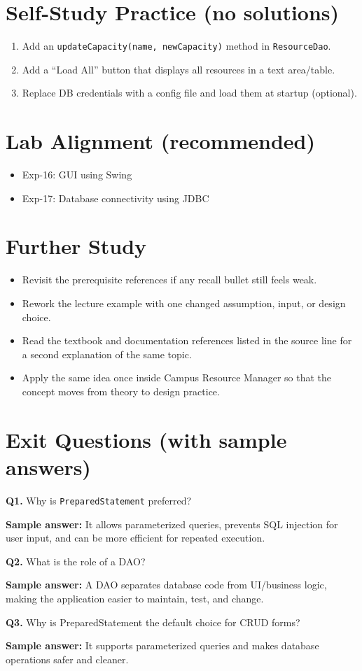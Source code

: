 \documentclass[11pt]{article}
\begin{document}
\section{Self-Study Practice (no solutions)}
\begin{enumerate}
  \item Add an \texttt{updateCapacity(name, newCapacity)} method in \texttt{ResourceDao}.
  \item Add a ``Load All'' button that displays all resources in a text area/table.
  \item Replace DB credentials with a config file and load them at startup (optional).
\end{enumerate}

\section{Lab Alignment (recommended)}
\begin{itemize}
  \item Exp-16: GUI using Swing
  \item Exp-17: Database connectivity using JDBC
\end{itemize}

\section{Further Study}
\begin{itemize}
  \item Revisit the prerequisite references if any recall bullet still feels weak.
  \item Rework the lecture example with one changed assumption, input, or design choice.
  \item Read the textbook and documentation references listed in the source line for a second explanation of the same topic.
  \item Apply the same idea once inside Campus Resource Manager so that the concept moves from theory to design practice.
\end{itemize}
\notesources{\OOPSUnitIVSources}

\section{Exit Questions (with sample answers)}
\textbf{Q1.} Why is \texttt{PreparedStatement} preferred?\par
\textbf{Sample answer:} It allows parameterized queries, prevents SQL injection for user input, and can be more efficient for repeated execution.

\vspace{0.6em}
\textbf{Q2.} What is the role of a DAO?\par
\textbf{Sample answer:} A DAO separates database code from UI/business logic, making the application easier to maintain, test, and change.

\vspace{0.6em}
\textbf{Q3.} Why is PreparedStatement the default choice for CRUD forms?\par
\textbf{Sample answer:} It supports parameterized queries and makes database operations safer and cleaner.
\end{document}
